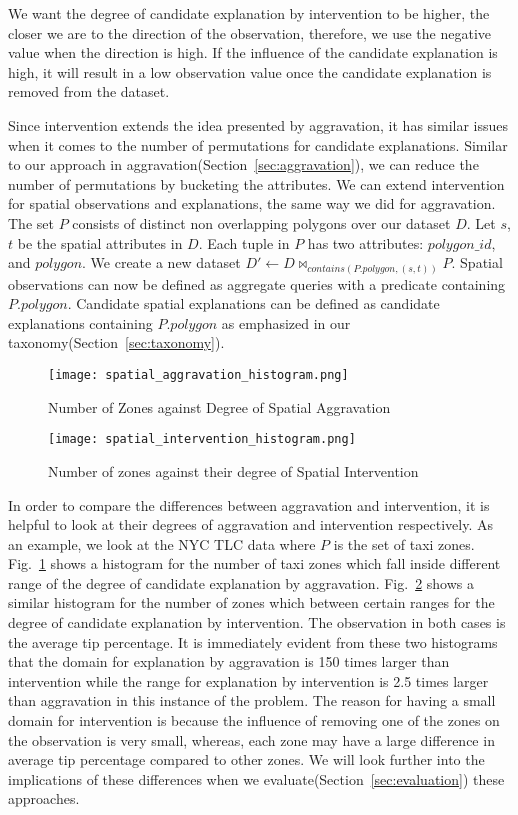We want the degree of candidate explanation by intervention to be higher, the closer we are to the direction of the observation, therefore, we use the negative value when the direction is high. If the influence of the candidate explanation is high, it will result in a low observation value once the candidate explanation is removed from the dataset.

Since intervention extends the idea presented by aggravation, it has similar issues when it comes to the number of permutations for candidate explanations. Similar to our approach in aggravation(Section~\ref{sec:aggravation}), we can reduce the number of permutations by bucketing the attributes. We can extend intervention for spatial observations and explanations, the same way we did for aggravation. The set $P$ consists of distinct non overlapping polygons over our dataset $D$. Let $s$,$t$ be the spatial attributes in $D$. Each tuple in $P$ has two attributes: $polygon\_id$, and $polygon$. We create a new dataset 
$D' \leftarrow D \bowtie_{contains(P.polygon,(s,t))} P$. Spatial observations can now be defined as aggregate queries with a predicate containing $P.polygon$. Candidate spatial explanations can be defined as candidate explanations containing $P.polygon$ as emphasized in our taxonomy(Section~\ref{sec:taxonomy}). 

\begin{figure}[ht]
\texttt{[image: spatial\_aggravation\_histogram.png]}
\caption{Number of Zones against Degree of Spatial Aggravation}
\label{fig:spatial_aggravation_histogram}
\end{figure}

\begin{figure}[ht]
\texttt{[image: spatial\_intervention\_histogram.png]}
\caption{Number of zones against their degree of Spatial Intervention}
\label{fig:spatial_intervention_histogram}
\end{figure}

In order to compare the differences between aggravation and intervention, it is helpful to look at their degrees of aggravation and intervention respectively. As an example, we look at the NYC TLC data where $P$ is the set of taxi zones. Fig.~\ref{fig:spatial_aggravation_histogram} shows a histogram for the number of taxi zones which fall inside different range of the degree of candidate explanation by aggravation. Fig.~\ref{fig:spatial_intervention_histogram} shows a similar histogram for the number of zones which between certain ranges for the degree of candidate explanation by intervention. The observation in both cases is the average tip percentage. It is immediately evident from these two histograms that the domain for explanation by aggravation is 150 times larger than intervention while the range for explanation by intervention is 2.5 times larger than aggravation in this instance of the problem. The reason for having a small domain for intervention is because the influence of removing one of the zones on the observation is very small, whereas, each zone may have a large difference in average tip percentage compared to other zones. We will look further into the implications of these differences when we evaluate(Section~\ref{sec:evaluation}) these approaches.

